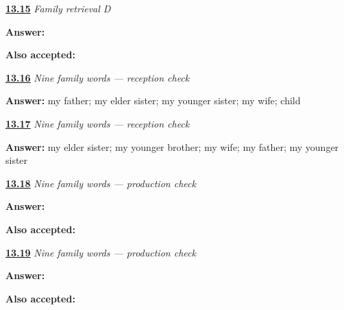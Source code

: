 \noindent\begin{minipage}[t]{\linewidth}
\raggedright
\hyperlink{review-JA-R13-family-d-recall}{\textbf{13.15}} \emph{Family retrieval D}\par
\small \textbf{Answer:} \par
\footnotesize \textbf{Also accepted:}  
\end{minipage}\par\medskip

\noindent\begin{minipage}[t]{\linewidth}
\raggedright
\hyperlink{review-JA-C13-family-reception-listening}{\textbf{13.16}} \emph{Nine family words — reception check}\par
\small \textbf{Answer:} my father; my elder sister; my younger sister; my wife; child\par
\end{minipage}\par\medskip

\noindent\begin{minipage}[t]{\linewidth}
\raggedright
\hyperlink{review-JA-C13-family-reception-reading}{\textbf{13.17}} \emph{Nine family words — reception check}\par
\small \textbf{Answer:} my elder sister; my younger brother; my wife; my father; my younger sister\par
\end{minipage}\par\medskip

\noindent\begin{minipage}[t]{\linewidth}
\raggedright
\hyperlink{review-JA-C13-family-check-speaking}{\textbf{13.18}} \emph{Nine family words — production check}\par
\small \textbf{Answer:} \par
\footnotesize \textbf{Also accepted:}     
\end{minipage}\par\medskip

\noindent\begin{minipage}[t]{\linewidth}
\raggedright
\hyperlink{review-JA-C13-family-check-writing}{\textbf{13.19}} \emph{Nine family words — production check}\par
\small \textbf{Answer:} \par
\footnotesize \textbf{Also accepted:}         
\end{minipage}\par\medskip
